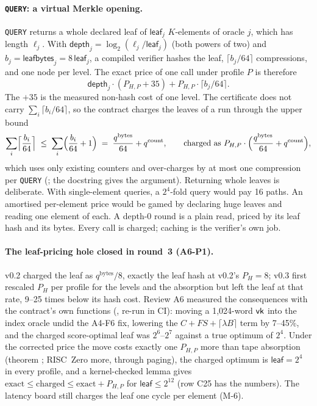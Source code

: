 \paragraph{\texttt{QUERY}: a virtual Merkle opening.} \texttt{QUERY} returns a whole declared leaf of
$\mathsf{leaf}_j$ $K$-elements of oracle $j$, which has length $\ell_j$. With
$\mathsf{depth}_j=\log_2(\ell_j/\mathsf{leaf}_j)$ (both powers of two) and
$b_j=\mathsf{leafbytes}_j=8\,\mathsf{leaf}_j$, a compiled verifier hashes the leaf, $\lceil b_j/64\rceil$
compressions, and one node per level. The exact price of one call under profile $P$ is therefore
\[
  \mathsf{depth}_j\cdot(P_{H,P}+35)+P_{H,P}\cdot\lceil b_j/64\rceil .
\]
The $+35$ is the measured non-hash cost of one level. The certificate does not carry
$\sum_i\lceil b_i/64\rceil$, so the contract charges the leaves of a run through the upper bound
\[
  \sum_i\Bigl\lceil\frac{b_i}{64}\Bigr\rceil\;\le\;\sum_i\Bigl(\frac{b_i}{64}+1\Bigr)
  \;=\;\frac{q^{\mathrm{bytes}}}{64}+q^{\mathrm{count}},
  \qquad\text{charged as } P_{H,P}\cdot\Bigl(\frac{q^{\mathrm{bytes}}}{64}+q^{\mathrm{count}}\Bigr),
\]
which uses only existing counters and over-charges by at most one compression per \texttt{QUERY}
(; the docstring gives the argument). Returning whole leaves is deliberate. With
single-element queries, a $2^4$-fold query would pay 16 paths. An amortised per-element price would be
gamed by declaring huge leaves and reading one element of each. A depth-0 round is a plain read,
priced by its leaf hash and its bytes. Every call is charged; caching is the verifier's own job.

\paragraph{The leaf-pricing hole closed in round~3 (A6-P1).} v0.2 charged the leaf as
$q^{\mathrm{bytes}}/8$, exactly the leaf hash at v0.2's $P_H=8$; v0.3 first rescaled $P_H$ per profile
for the levels and the absorption but left the leaf at that rate, 9--25 times below its hash cost.
Review A6 measured the consequences with the contract's own functions (,
re-run in CI): moving a 1{,}024-word $\mathsf{vk}$ into the index oracle undid the A4-F6 fix, lowering the
$C+\mathit{FS}+\lceil\lambda B\rceil$ term by 7--45\%, and the charged score-optimal leaf was
$2^6$--$2^7$ against a true optimum of $2^4$. Under the corrected price the move costs exactly one
$P_{H,P}$ more than tape absorption (theorem ; RISC~Zero more, through
paging), the charged optimum is $\mathsf{leaf}=2^4$ in every profile, and a kernel-checked lemma gives
$\text{exact}\le\text{charged}\le\text{exact}+P_{H,P}$ for $\mathsf{leaf}\le2^{12}$ (row C25 has the
numbers). The latency board still charges the leaf one cycle per element (M-6).

